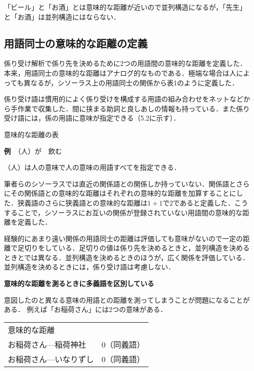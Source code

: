 \documentclass[japanese]{jnlp_1.4}
\begin{document}
「ビール」と「お酒」とは意味的な距離が近いので並列構造になるが，「先生」と「お酒」は並列構造にはならない．



\subsection{用語同士の意味的な距離の定義}

係り受け解析で係り先を決めるために2つの用語間の意味的な距離を定義した．本来，用語同士の意味的な距離はアナログ的なものである．極端な場合は人によっても異なるが，シソーラス上の用語同士の関係から表1のように定義した．


係り受け語は慣用的によく係り受けを構成する用語の組み合わせをネットなどから手作業で収集した．間に挟まる助詞と良しあしの情報も持っている．また係り受け語には，係の用語に意味が指定できる（5.2に示す）．

\begin{table}[tb]
 \caption{意味的な距離の表}

\end{table}

{\bfseries 例}　（人）が　飲む　　　

（人）は人の意味で人の意味の用語すべてを指定できる．

筆者らのシソーラスでは直近の関係語との関係しか持っていない．関係語とさらにその関係語との意味的な距離はそれぞれの意味的な距離を加算することにした．狭義語のさらに狭義語との意味的な距離は$1+1$で$2$であると定義した．こうすることで，シソーラスにお互いの関係が登録されていない用語間の意味的な距離を定義した．

経験的にあまり遠い関係の用語同士の距離は評価しても意味がないので一定の距離で足切りをしている．足切りの値は係り先を決めるときと，並列構造を決めるときとでは異なる．並列構造を決めるときのほうが，広く関係を評価している．並列構造を決めるときには，係り受け語は考慮しない．

{\bfseries 意味的な距離を測るときに多義語を区別している}

意図したのと異なる意味の用語との距離を測ってしまうことが問題になることがある．
例えば「お稲荷さん」には2つの意味がある．

\vspace{0.3zw}
\begin{tabular}{ll}
意味的な距離 \\
お稲荷さん—稲荷神社 & 0（同義語）\\
お稲荷さん—いなりずし & 0（同義語）
\end{tabular}
\vspace{0.3zw}
\end{document}
